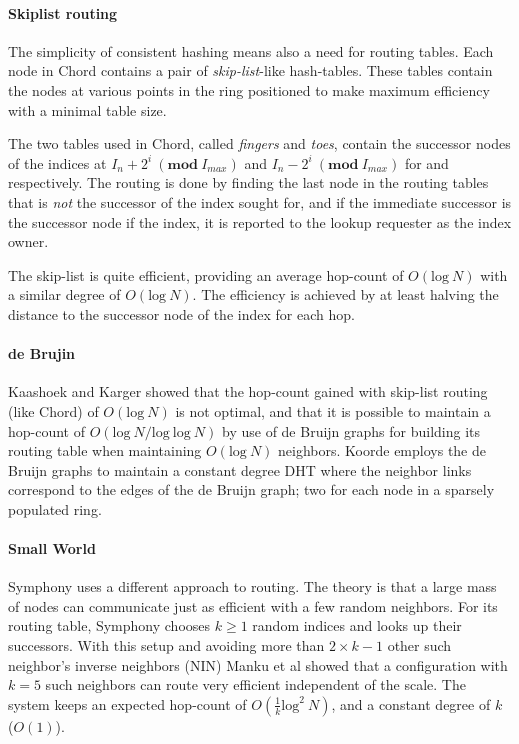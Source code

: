 \paragraph{Skiplist routing}

The simplicity of consistent hashing means also a need for routing tables. Each node
 in Chord contains a pair of \emph{skip-list}-like hash-tables. These tables contain
 the nodes at various points in the ring positioned to make maximum efficiency
 with a minimal table size.

The two tables used in Chord, called \emph{fingers} and \emph{toes},
 contain the successor nodes of the indices at 
   $I_n + {2^i}\ (\mathbf{mod}\ I_{max})$ and
   $I_n - {2^i}\ (\mathbf{mod}\ I_{max})$ for
    and  respectively.
 The routing is done by finding the last node in the routing
 tables that is \emph{not} the successor of the
 index sought for, and if the immediate successor is the successor
 node if the index, it is reported to the lookup requester as the
 index owner.

The skip-list is quite efficient, providing an average hop-count of
 $O(\mathrm{log\ }N)$ with a similar degree of $O(\mathrm{log\ }N)$. The efficiency is
 achieved by at least halving the distance to the successor node of the index
 for each hop.

\paragraph{de Brujin}
Kaashoek and Karger\cite{kaashoek-03-koorde} showed that the hop-count gained with
 skip-list routing (like Chord) of $O(\mathrm{log\ }N)$ is not
 optimal, and that it is possible to maintain a hop-count of
   $O(\mathrm{log\ }N / \mathrm{log\ log\ }N)$
 by use of de Bruijn graphs for building its routing table when maintaining
   $O(\mathrm{log\ }N)$ neighbors. Koorde employs the de Bruijn graphs to maintain
 a constant degree DHT where the neighbor links correspond to the edges of the de
 Bruijn graph; two for each node in a sparsely populated ring.

\paragraph{Small World}
Symphony uses a different approach to routing. The theory is
 that a large mass of nodes can communicate just as efficient with a few random
 neighbors. For its routing table, Symphony chooses $k\ge1$ random indices and looks
 up their successors. With this setup and avoiding more than $2\times k -1$ other such neighbor's
 inverse neighbors (NIN) Manku et al\cite{manku-03-symphony} showed that a
 configuration with $k=5$
 such neighbors can route very efficient independent of the scale.
 The system keeps an expected hop-count of $O(\frac{1}{k}\mathrm{log}^2\ N)$, and a
 constant degree of $k$ ($O(1)$).




